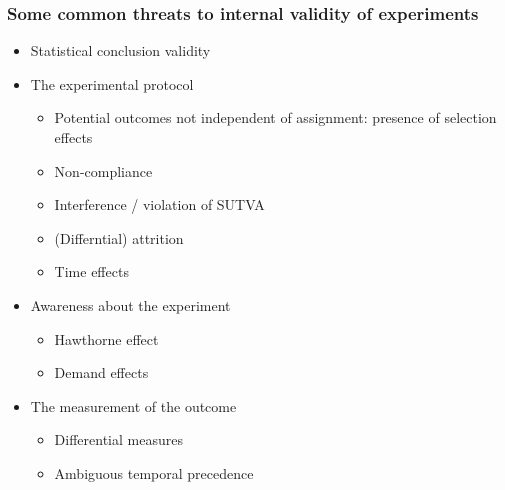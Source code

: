 \documentclass[10pt]{article}
\begin{document}
\subsubsection{Some common threats to internal validity of experiments}
\begin{itemize}
    \item Statistical conclusion validity
    \item The experimental protocol
    \begin{itemize}
        \item Potential outcomes not independent of assignment: presence of selection effects 
        \item Non-compliance
        \item Interference / violation of SUTVA 
        \item (Differntial) attrition 
        \item Time effects 
    \end{itemize}
    \item Awareness about the experiment
    \begin{itemize}
        \item Hawthorne effect 
        \item Demand effects 
    \end{itemize}
    \item The measurement of the outcome 
    \begin{itemize}
        \item Differential measures 
        \item Ambiguous temporal precedence 
    \end{itemize}
\end{itemize}
\end{document}
